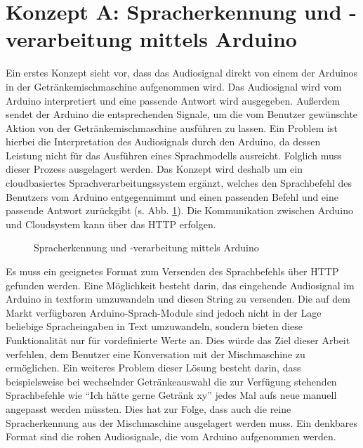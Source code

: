 \section{Konzept A: Spracherkennung und -verarbeitung mittels Arduino} \label{section:Konzept_A}
Ein erstes Konzept sieht vor, dass das Audiosignal direkt von einem der Arduinos in der Getränkemischmaschine aufgenommen wird.
Das Audiosignal wird vom Arduino interpretiert und eine passende Antwort wird ausgegeben.
Außerdem sendet der Arduino die entsprechenden Signale, um die vom Benutzer gewünschte Aktion von der Getränkemischmaschine ausführen zu lassen.
Ein Problem ist hierbei die Interpretation des Audiosignals durch den Arduino, da dessen Leistung nicht für das Ausführen eines Sprachmodells ausreicht.
Folglich muss dieser Prozess ausgelagert werden.
Das Konzept wird deshalb um ein cloudbasiertes Sprachverarbeitungssystem ergänzt, welches den Sprachbefehl des Benutzers vom Arduino entgegennimmt und einen passenden Befehl und eine passende Antwort zurückgibt (s. Abb. \ref{figure:Spracherkennung_mittels_Arduino}).
Die Kommunikation zwischen Arduino und Cloudsystem kann über das \ac{HTTP} erfolgen.
\begin{figure}[H]
    \centering
    \caption{\label{figure:Spracherkennung_mittels_Arduino}Spracherkennung und -verarbeitung mittels Arduino}
\end{figure}
\noindent
Es muss ein geeignetes Format zum Versenden des Sprachbefehls über \ac{HTTP} gefunden werden.
Eine Möglichkeit besteht darin, das eingehende Audiosignal im Arduino in textform umzuwandeln und diesen String zu versenden.
Die auf dem Markt verfügbaren Arduino-Sprach-Module sind jedoch nicht in der Lage beliebige Spracheingaben in Text umzuwandeln, sondern bieten diese Funktionalität nur für vordefinierte Werte an.
Dies würde das Ziel dieser Arbeit verfehlen, dem Benutzer eine Konversation mit der Mischmaschine zu ermöglichen.
Ein weiteres Problem dieser Lösung besteht darin, dass beispielsweise bei wechselnder Getränkeauswahl die zur Verfügung stehenden Sprachbefehle wie "`Ich hätte gerne Getränk xy"' jedes Mal aufs neue manuell angepasst werden müssten.
Dies hat zur Folge, dass auch die reine Spracherkennung aus der Mischmaschine ausgelagert werden muss.
Ein denkbares Format sind die rohen Audiosignale, die vom Arduino aufgenommen werden.
